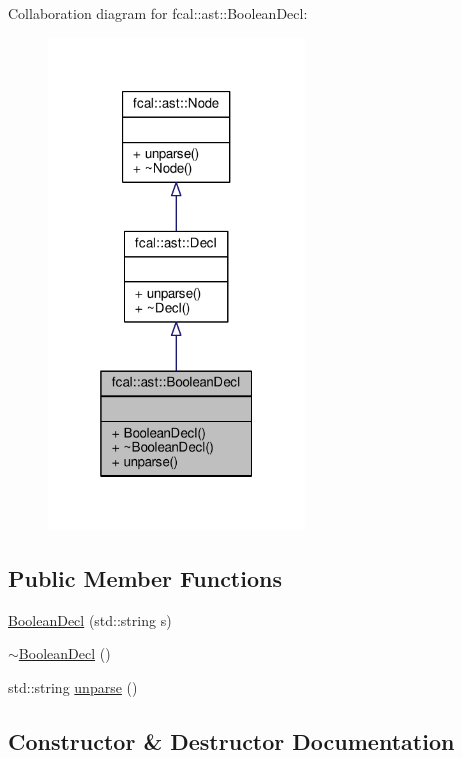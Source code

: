 Collaboration diagram for fcal\+:\+:ast\+:\+:Boolean\+Decl\+:
\nopagebreak
\begin{figure}[H]
\begin{center}
\leavevmode
\includegraphics[width=193pt]{classfcal_1_1ast_1_1BooleanDecl__coll__graph}
\end{center}
\end{figure}
\subsection*{Public Member Functions}
\begin{DoxyCompactItemize}
\item 
\hyperlink{classfcal_1_1ast_1_1BooleanDecl_a963be5fff559039b7200f6160e40c91b}{Boolean\+Decl} (std\+::string s)
\item 
\hyperlink{classfcal_1_1ast_1_1BooleanDecl_a84df7f6e1819fdfa6ef4329a32a81931}{$\sim$\+Boolean\+Decl} ()
\item 
std\+::string \hyperlink{classfcal_1_1ast_1_1BooleanDecl_a6f7b128adddaf89386c3b266f3fa0198}{unparse} ()
\end{DoxyCompactItemize}


\subsection{Constructor \& Destructor Documentation}
